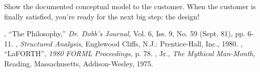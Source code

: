 Show the documented conceptual model to the customer. When the
customer is finally satisfied, you're ready for the next big step: the
design!%
%

\begin{references}{9}
 , ``The \Forth{} Philosophy,''
  \emph{Dr. Dobb's Journal,} Vol. 6, Iss. 9, No. 59 (Sept. 81),
  pp. 6-11.
 , \emph{Structured Analysis,}
  Englewood Cliffs, N.J.: Prentice-Hall, Inc., 1980.
 , ``LaFORTH'',
  \emph{1980 FORML Proceedings,} p. 78.
 , Jr., \emph{The Mythical
  Man-Month,} Reading, Massachusetts, Addison-Wesley, 1975.
\end{references}

